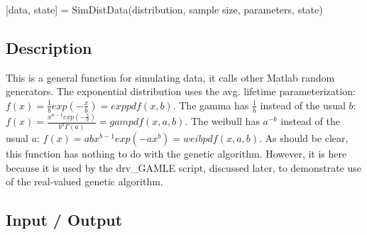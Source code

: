 \documentclass{book}
\newcommand{\textcode}[1]{\textsf{\small #1}}   %
\begin{document}
\textcode{[data, state] = SimDistData(distribution, sample size,
parameters, state)}

\subsection*{Description}

This is a general function for simulating data, it calls other
Matlab random generators. The exponential distribution uses the avg.
lifetime
parameterization: $f\left( x\right) =\frac{1}{b}exp\left( -\frac{x}{b}%
\right) =exppdf(x,b)$. The gamma has $\frac{1}{b}$ instead of the
usual $b$: $f\left( x\right) =\frac{x^{a-1}exp\left(
-\frac{x}{b}\right) }{b^{a}\Gamma \left( a\right) }=gampdf(x,a,b)$.
The weibull has $a^{-b}$ instead of the usual $a$: $f\left( x\right)
=abx^{b-1}exp(-ax^{b})=weibpdf(x,a,b)$. As should be clear, this
function has nothing to do with the genetic algorithm. However, it
is here because it is used by the \textcode{drv\_GAMLE} script,
discussed later, to demonstrate use of the real-valued genetic
algorithm.

\subsection*{Input / Output}
\end{document}
